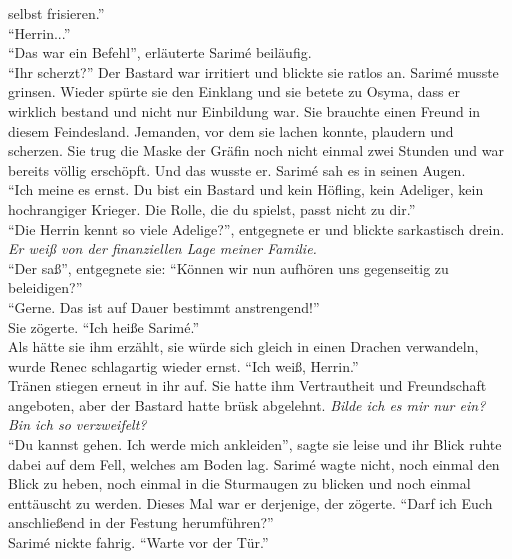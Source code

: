 selbst frisieren.''\\
``Herrin...''\\
``Das war ein Befehl'', erläuterte Sarimé beiläufig. \\
``Ihr scherzt?'' Der Bastard war irritiert und blickte sie ratlos an. Sarimé musste grinsen. Wieder 
spürte sie den Einklang und sie betete zu Osyma, dass er wirklich bestand und nicht nur Einbildung 
war. Sie brauchte einen Freund in diesem Feindesland. Jemanden, vor dem sie lachen konnte, plaudern 
und scherzen. Sie trug die Maske der Gräfin noch nicht einmal zwei Stunden und war bereits völlig 
erschöpft. Und das wusste er. Sarimé sah es in seinen Augen. \\
``Ich meine es ernst. Du bist ein Bastard und kein Höfling, kein Adeliger, kein hochrangiger 
Krieger. Die Rolle, die du spielst, passt nicht zu dir.''\\
``Die Herrin kennt so viele Adelige?'', entgegnete er und blickte sarkastisch drein.\\
\textit{Er weiß von der finanziellen Lage meiner Familie.}\\ 
``Der saß'', entgegnete sie: ``Können wir nun aufhören uns gegenseitig zu beleidigen?''\\
``Gerne. Das ist auf Dauer bestimmt anstrengend!''\\
Sie zögerte. ``Ich heiße Sarimé.''\\
Als hätte sie ihm erzählt, sie würde sich gleich in einen Drachen verwandeln, wurde Renec 
schlagartig wieder ernst. ``Ich weiß, Herrin.''\\
Tränen stiegen erneut in ihr auf. Sie hatte ihm Vertrautheit und Freundschaft angeboten, aber der 
Bastard hatte brüsk abgelehnt. \textit{Bilde ich es mir nur ein? Bin ich so verzweifelt?}\\
``Du kannst gehen. Ich werde mich ankleiden'', sagte sie leise und ihr Blick ruhte dabei auf 
dem Fell, welches am Boden lag. Sarimé wagte nicht, noch einmal den Blick zu heben, noch einmal in 
die Sturmaugen zu blicken und noch einmal enttäuscht zu werden. Dieses Mal war er derjenige, der 
zögerte. ``Darf ich Euch anschließend in der Festung herumführen?''\\
Sarimé nickte fahrig. ``Warte vor der Tür.''\\



